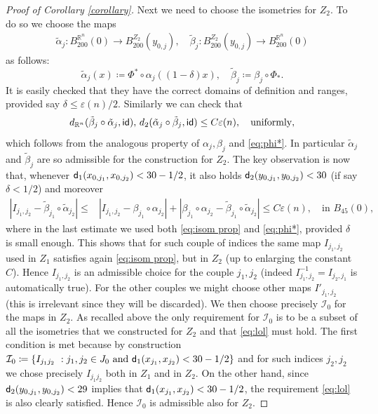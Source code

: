 \documentclass[11pt]{article}
\newcommand{\eps}{\varepsilon}
\newcommand{\rr}{\mathbb{R}}
\newcommand{\sfd}{{\sf d}}
\newcommand{\id}{{\sf id}}
\theoremstyle{plain}
\theoremstyle{definition}
\numberwithin{equation}{section}
\begin{document}
\begin{proof}[Proof of Corollary \ref{corollary}]
Next we need to choose the isometries for $Z_2$. To do so we  choose the maps
\begin{align*}
    \tilde \alpha_{j} : B^{\rr^n}_{200}(0) \to B^{Z_2}_{200}(y_{0,j}), \quad 
\tilde \beta_{j}: B^{Z_2}_{200}(y_{0,j}) \to B^{\rr^n}_{200}(0)
\end{align*}
as follows:
\[
\tilde \alpha_j(x)\coloneqq \Phi^*\circ \alpha_j((1-\delta)x), \quad \tilde \beta_j\coloneqq\beta_j\circ  \Phi_*.
\]
It is easily checked that they have the correct domains of definition and ranges, provided say $\delta \le \eps(n)/2$. Similarly we can check that
\[
d_{\rr^n}(\tilde \beta_{j}\circ \tilde \alpha_{j},\id), \, d_2(\tilde \alpha_{j}\circ \tilde \beta_{j},\id)\le C\eps(n), \quad \text{uniformly},
\]
which follows from the analogous property of $\alpha_j,\beta_j$ and \eqref{eq:phi*}. In particular  $\tilde \alpha_j$ and $\tilde \beta_j$  are so admissible for the construction for $Z_2.$ The key observation is now that, whenever  $\sfd_1(x_{0,j_1},x_{0,j_2})<30-1/2$, it also holds $\sfd_2(y_{0,j_1},y_{0,j_2})<30$ (if say $\delta<1/2$)  and moreover 
\begin{align*}
    |I_{j_1,j_2}-\tilde \beta_{j_1}\circ\tilde \alpha_{j_2}|\le 
    &|I_{j_1,j_2}-\beta_{j_1}\circ\alpha_{j_2}|+|\beta_{j_1}\circ\alpha_{j_2}-\tilde \beta_{j_1}\circ\tilde \alpha_{j_2}|\le C\eps(n),  \quad \text{in $B_{45}(0)$,}
\end{align*}
where in the last estimate we used both \eqref{eq:isom prop} and \eqref{eq:phi*}, provided $\delta$ is small enough. This shows that for such couple of indices   the same map $I_{j_1,j_2}$ used  in $Z_1$ satisfies again \eqref{eq:isom prop}, but in $Z_2$ (up to enlarging the constant $C$). Hence $I_{j_1,j_2}$ is an admissible choice for the couple $j_1,j_2$ (indeed $I_{j_1,j_2}^{-1}=I_{j_2,j_1}$ is automatically true). For the other couples  we might choose other maps $I'_{j_1,j_2}$ (this is irrelevant since they will be discarded). We then choose precisely $\mathcal I_0$   for the maps in $Z_2$. As recalled above the only requirement for $\mathcal I_0$ is to be a subset of all the isometries that we  constructed for $Z_2$   and that \eqref{eq:lol} must hold. The first condition is met because by construction $ \mathcal I_0\coloneqq  \{I_{j_1j_2}\ : j_1,j_2 \in J_0 \text{ and }\sfd_1(x_{j_1},x_{j_2})<30-1/2\}$ and for such indices $j_2,j_2$ we chose precisely $I_{j_1j_2}$ both in $Z_1$ and in $Z_2.$
On the other hand, since  $\sfd_2(y_{0,j_1},y_{0,j_2})<29$ implies that $\sfd_1(x_{j_1},x_{j_2})<30-1/2$, the requirement \eqref{eq:lol} is also clearly satisfied. Hence $\mathcal I_0$ is admissible also for $Z_2$.


\end{proof}
\end{document}
